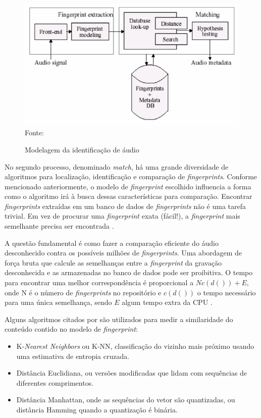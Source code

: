 \begin{figure}[!htb]
   \centering
   \caption{Modelagem da identificação de áudio}\label{fig:identAudio} 
   \includegraphics[scale=0.62]{figuras/etapasFinger2.png}
   \\Fonte: \cite{henriques2003}
\end{figure}

No segundo processo, denominado \textit{match}, há uma grande diversidade de algoritmos para localização, identificação e comparação de \textit{fingerprints}. Conforme mencionado anteriormente, o modelo de \textit{fingerprint} escolhido influencia a forma como o algoritmo irá à busca dessas características para comparação. Encontrar \textit{fingerprints} extraídas em um banco de dados de \textit{fingerprints} não é uma tarefa trivial. Em vez de procurar uma \textit{fingerprint} exata (fácil!), a \textit{fingerprint} mais semelhante precisa ser encontrada \cite{haitsma2002}.

A questão fundamental é como fazer a comparação eficiente do áudio desconhecido contra os possíveis milhões de \textit{fingerprints}. Uma abordagem de força bruta que calcule as semelhanças entre a \textit{fingerprint} da gravação desconhecida e as armazenadas no banco de dados pode ser proibitiva. O tempo para encontrar uma melhor correspondência é proporcional a \({N c(d()) + E}\), onde N é o número de \textit{fingerprints} no repositório e \({c(d())}\) o tempo necessário para uma única semelhança, sendo \({E}\) algum tempo extra da CPU \cite{cano2005}.

Alguns algoritmos citados por  são utilizados para medir a similaridade do conteúdo contido no modelo de \textit{fingerprint}:

\begin{itemize}
    \item K-\textit{Nearest Neighbors} ou K-NN, classificação do vizinho mais próximo usando uma estimativa de entropia cruzada.
    \item Distância Euclidiana, ou versões modificadas que lidam com sequências de diferentes comprimentos.
    \item Distância Manhattan, onde as sequências do vetor são quantizadas, ou distância Hamming quando a quantização é binária.
\end{itemize}

